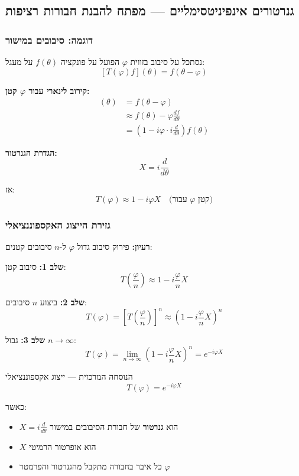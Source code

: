 \subsection{גנרטורים אינפיניטסימליים — מפתח להבנת חבורות רציפות}

\subsubsection{דוגמה: סיבובים במישור}

נסתכל על סיבוב בזווית $\varphi$ הפועל על פונקציה $f(\theta)$ על מעגל:
\[
[T(\varphi) f](\theta) = f(\theta - \varphi)
\]

\textbf{קירוב לינארי עבור $\varphi$ קטן:}
\begin{align*}
[T(\varphi) f](\theta) &= f(\theta - \varphi) \\
&\approx f(\theta) - \varphi \frac{df}{d\theta} \\
&= \left(1 - i\varphi \cdot i\frac{d}{d\theta}\right) f(\theta)
\end{align*}

\textbf{הגדרת הגנרטור:}
\[
X = i\frac{d}{d\theta}
\]

אז:
\[
T(\varphi) \approx 1 - i\varphi X \quad \text{(עבור } \varphi \text{ קטן)}
\]

\subsubsection{גזירת הייצוג האקספוננציאלי}

\textbf{רעיון:} פירוק סיבוב גדול $\varphi$ ל-$n$ סיבובים קטנים:

\textbf{שלב 1:} סיבוב קטן:
\[
T\left(\frac{\varphi}{n}\right) \approx 1 - i\frac{\varphi}{n} X
\]

\textbf{שלב 2:} ביצוע $n$ סיבובים:
\[
T(\varphi) = \left[T\left(\frac{\varphi}{n}\right)\right]^n \approx \left(1 - i\frac{\varphi}{n} X\right)^n
\]

\textbf{שלב 3:} גבול $n \to \infty$:
\[
T(\varphi) = \lim_{n\to\infty} \left(1 - i\frac{\varphi}{n} X\right)^n = \boxed{e^{-i\varphi X}}
\]

\begin{importantbox}{הנוסחה המרכזית — ייצוג אקספוננציאלי}
\[
\boxed{T(\varphi) = e^{-i\varphi X}}
\]

כאשר:
\begin{itemize}
    \item $X = i\frac{d}{d\theta}$ הוא \textbf{גנרטור} של חבורת הסיבובים במישור
    \item $X$ הוא אופרטור הרמיטי
    \item כל איבר בחבורה מתקבל מהגנרטור והפרמטר $\varphi$
\end{itemize}
\end{importantbox}

